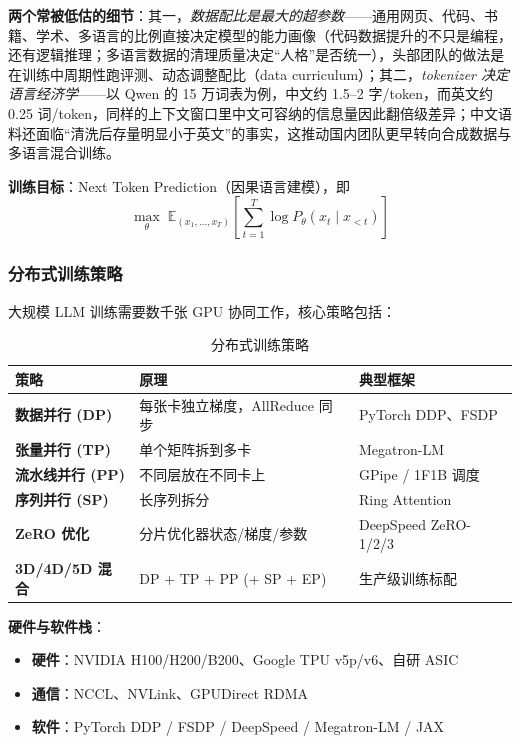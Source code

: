 \documentclass[12pt,a4paper]{article}
\begin{document}
\textbf{两个常被低估的细节}：其一，\emph{数据配比是最大的超参数}——通用网页、代码、书籍、学术、多语言的比例直接决定模型的能力画像（代码数据提升的不只是编程，还有逻辑推理；多语言数据的清理质量决定“人格”是否统一），头部团队的做法是在训练中周期性跑评测、动态调整配比（data curriculum）；其二，\emph{tokenizer 决定语言经济学}——以 Qwen 的 15 万词表为例，中文约 1.5--2 字/token，而英文约 0.25 词/token，同样的上下文窗口里中文可容纳的信息量因此翻倍级差异；中文语料还面临“清洗后存量明显小于英文”的事实，这推动国内团队更早转向合成数据与多语言混合训练。

\textbf{训练目标}：Next Token Prediction（因果语言建模），即
\[
\max_\theta \; \mathbb{E}_{(x_1,\ldots,x_T)} \left[ \sum_{t=1}^{T} \log P_\theta(x_t \mid x_{<t}) \right]
\]

\subsubsection{分布式训练策略}
大规模 LLM 训练需要数千张 GPU 协同工作，核心策略包括：

\begin{table}[htbp]
\centering
\small
\begin{tabular}{@{}lll@{}}
\toprule
\textbf{策略} & \textbf{原理} & \textbf{典型框架}\\
\midrule
\textbf{数据并行 (DP)} & 每张卡独立梯度，AllReduce 同步 & PyTorch DDP、FSDP\\
\textbf{张量并行 (TP)} & 单个矩阵拆到多卡 & Megatron-LM\\
\textbf{流水线并行 (PP)} & 不同层放在不同卡上 & GPipe / 1F1B 调度\\
\textbf{序列并行 (SP)} & 长序列拆分 & Ring Attention\\
\textbf{ZeRO 优化} & 分片优化器状态/梯度/参数 & DeepSpeed ZeRO-1/2/3\\
\textbf{3D/4D/5D 混合} & DP + TP + PP (+ SP + EP) & 生产级训练标配\\
\bottomrule
\end{tabular}
\caption{分布式训练策略}
\end{table}

\textbf{硬件与软件栈}：
\begin{itemize}
  \item \textbf{硬件}：NVIDIA H100/H200/B200、Google TPU v5p/v6、自研 ASIC
  \item \textbf{通信}：NCCL、NVLink、GPUDirect RDMA
  \item \textbf{软件}：PyTorch DDP / FSDP / DeepSpeed / Megatron-LM / JAX
\end{itemize}
\end{document}
